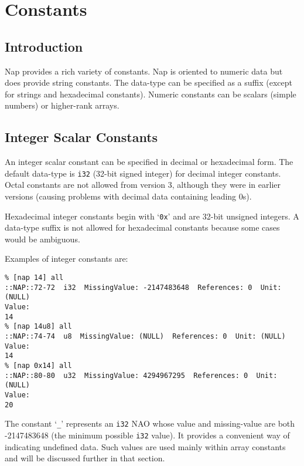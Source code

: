 
\section{Constants}
    \label{const}

\subsection{Introduction}
      \label{const-Introduction}

Nap provides a rich variety of constants. Nap is oriented to
    numeric data but does provide string constants. The data-type can
    be specified as a suffix (except for strings and hexadecimal
    constants). Numeric constants can be scalars (simple numbers) or
    higher-rank arrays.

\subsection{Integer Scalar Constants}
      \label{const-Integer-Scalar-Constants}

An integer scalar constant can be specified in decimal or
    hexadecimal form. The default data-type is 
    \texttt{i32} (32-bit signed integer) for decimal integer
    constants. Octal constants are not allowed from version 3, although
    they were in earlier versions (causing problems with decimal data
    containing leading 0s).
    

Hexadecimal integer constants begin with `\texttt{0x}' and are
    32-bit unsigned integers. A data-type suffix is not allowed for
    hexadecimal constants because some cases would be ambiguous.
    

Examples of integer constants are:
    \begin{verbatim}
% [nap 14] all
::NAP::72-72  i32  MissingValue: -2147483648  References: 0  Unit: (NULL)
Value:
14
% [nap 14u8] all
::NAP::74-74  u8  MissingValue: (NULL)  References: 0  Unit: (NULL)
Value:
14
% [nap 0x14] all
::NAP::80-80  u32  MissingValue: 4294967295  References: 0  Unit: (NULL)
Value:
20
\end{verbatim}

    

The constant `\texttt{\_}' represents an 
    \texttt{i32} NAO whose value and missing-value are both
    -2147483648 (the minimum possible 
    \texttt{i32} value). It provides a convenient way of indicating
    undefined data. Such values are used mainly within array constants
    and will be discussed further in that section.

